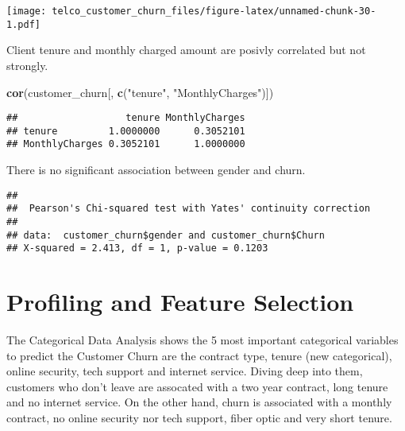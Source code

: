 \documentclass[
  a4paper]{article}
\newenvironment{Shaded}{\begin{snugshade}}{\end{snugshade}}
\newcommand{\FunctionTok}[1]{\textcolor[rgb]{0.13,0.29,0.53}{\textbf{#1}}}
\newcommand{\NormalTok}[1]{#1}
\newcommand{\SpecialCharTok}[1]{\textcolor[rgb]{0.81,0.36,0.00}{\textbf{#1}}}
\newcommand{\StringTok}[1]{\textcolor[rgb]{0.31,0.60,0.02}{#1}}
\begin{document}
\texttt{[image: telco\_customer\_churn\_files/figure-latex/unnamed-chunk-30-1.pdf]}

Client tenure and monthly charged amount are posivly correlated but not
strongly.

\begin{Shaded}
\begin{Highlighting}[]
\FunctionTok{cor}\NormalTok{(customer\_churn[, }\FunctionTok{c}\NormalTok{(}\StringTok{"tenure"}\NormalTok{, }\StringTok{"MonthlyCharges"}\NormalTok{)])}
\end{Highlighting}
\end{Shaded}

\begin{verbatim}
##                   tenure MonthlyCharges
## tenure         1.0000000      0.3052101
## MonthlyCharges 0.3052101      1.0000000
\end{verbatim}

There is no significant association between gender and churn.

\begin{Shaded}
\end{Shaded}

\begin{verbatim}
## 
##  Pearson's Chi-squared test with Yates' continuity correction
## 
## data:  customer_churn$gender and customer_churn$Churn
## X-squared = 2.413, df = 1, p-value = 0.1203
\end{verbatim}

\hypertarget{profiling-and-feature-selection}{%
\section{Profiling and Feature
Selection}\label{profiling-and-feature-selection}}

The Categorical Data Analysis shows the 5 most important categorical
variables to predict the Customer Churn are the contract type, tenure
(new categorical), online security, tech support and internet service.
Diving deep into them, customers who don't leave are assocated with a
two year contract, long tenure and no internet service. On the other
hand, churn is associated with a monthly contract, no online security
nor tech support, fiber optic and very short tenure.
\end{document}
